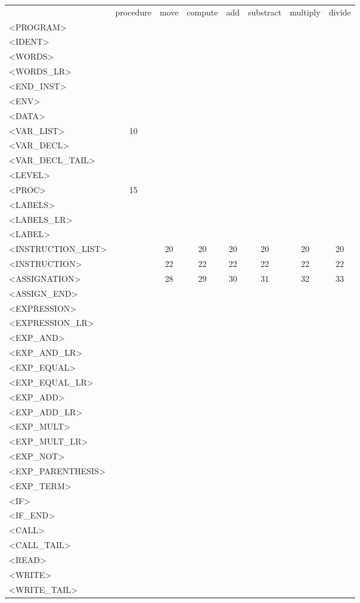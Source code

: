 \documentclass[a4paper,11pt]{article}
\begin{document}
\begin{longtable}{l||ccccccc}
	& procedure & move & compute & add & substract & multiply & divide \\
	<PROGRAM> & & & & & & & \\
	<IDENT> & & & & & & & \\
	<WORDS> & & & & & & & \\
	<WORDS\_LR> & & & & & & & \\
	<END\_INST> & & & & & & & \\
	<ENV> & & & & & & & \\
	<DATA> & & & & & & & \\
	<VAR\_LIST> & 10 & & & & & & \\
	<VAR\_DECL> & & & & & & & \\
	<VAR\_DECL\_TAIL> & & & & & & & \\
	<LEVEL> & & & & & & & \\
	<PROC> & 15 & & & & & & \\
	<LABELS> & & & & & & & \\
	<LABELS\_LR> & & & & & & & \\
	<LABEL> & & & & & & & \\
	<INSTRUCTION\_LIST> & & 20 & 20 & 20 & 20 & 20 & 20 \\
	<INSTRUCTION> & & 22 & 22 & 22 & 22 & 22 & 22 \\
	<ASSIGNATION> & & 28 & 29 & 30 & 31 & 32 & 33 \\
	<ASSIGN\_END> & & & & & & & \\
	<EXPRESSION> & & & & & & & \\
	<EXPRESSION\_LR> & & & & & & & \\
	<EXP\_AND> & & & & & & & \\
	<EXP\_AND\_LR> & & & & & & & \\
	<EXP\_EQUAL> & & & & & & & \\
	<EXP\_EQUAL\_LR> & & & & & & & \\
	<EXP\_ADD> & & & & & & & \\
	<EXP\_ADD\_LR> & & & & & & & \\
	<EXP\_MULT> & & & & & & & \\
	<EXP\_MULT\_LR> & & & & & & & \\
	<EXP\_NOT> & & & & & & & \\
	<EXP\_PARENTHESIS> & & & & & & & \\
	<EXP\_TERM> & & & & & & & \\
	<IF> & & & & & & & \\
	<IF\_END> & & & & & & & \\
	<CALL> & & & & & & & \\
	<CALL\_TAIL> & & & & & & & \\
	<READ> & & & & & & & \\
	<WRITE> & & & & & & & \\
	<WRITE\_TAIL> & & & & & & & \\
\end{longtable}
\end{document}
